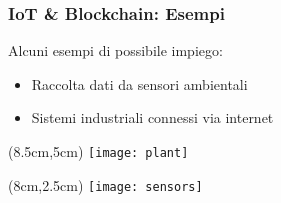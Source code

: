 \begin{frame}
 \frametitle{IoT \& Blockchain: Esempi}

 Alcuni esempi di possibile impiego:
 \begin{itemize}
  \item<1-> Raccolta dati da sensori ambientali
  \item<2-> Sistemi industriali connessi via internet
 \end{itemize}
 
 
 \begin{textblock*}{5cm}(8.5cm,5cm)
  \texttt{[image: plant]}
 \end{textblock*}

 \begin{textblock*}{5cm}(8cm,2.5cm)
  \texttt{[image: sensors]}
 \end{textblock*}
\end{frame}

%
%
%
